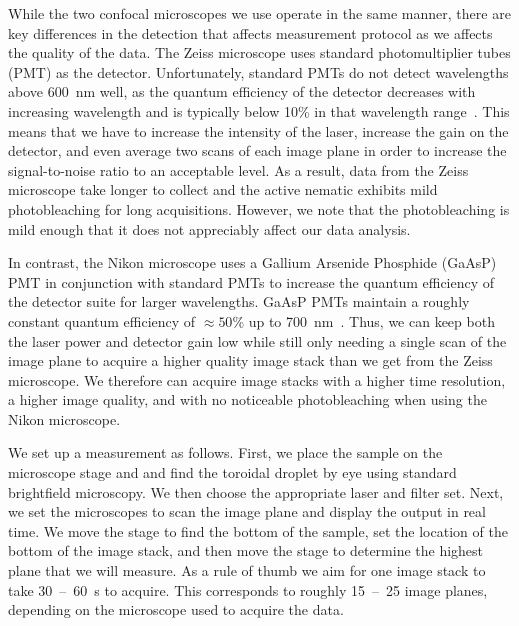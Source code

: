 While the two confocal microscopes we use operate in the same manner, there are key differences in the detection that affects measurement protocol as we affects the quality of the data.
The Zeiss microscope uses standard photomultiplier tubes (PMT) as the detector.
Unfortunately, standard PMTs do not detect wavelengths above 600~nm well, as the quantum efficiency of the detector decreases with increasing wavelength and is typically below 10\% in that wavelength range~\cite{RN263}.
This means that we have to increase the intensity of the laser, increase the gain on the detector, and even average two scans of each image plane in order to increase the signal-to-noise ratio to an acceptable level.
As a result, data from the Zeiss microscope take longer to collect and the active nematic exhibits mild photobleaching for long acquisitions.
However, we note that the photobleaching is mild enough that it does not appreciably affect our data analysis.

In contrast, the Nikon microscope uses a Gallium Arsenide Phosphide (GaAsP) PMT in conjunction with standard PMTs to increase the quantum efficiency of the detector suite for larger wavelengths.
GaAsP PMTs maintain a roughly constant quantum efficiency of $\approx 50$\% up to 700~nm~\cite{RN263}.
Thus, we can keep both the laser power and detector gain low while still only needing a single scan of the image plane to acquire a higher quality image stack than we get from the Zeiss microscope.
We therefore can acquire image stacks with a higher time resolution, a higher image quality, and with no noticeable photobleaching when using the Nikon microscope.

We set up a measurement as follows.
First, we place the sample on the microscope stage and and find the toroidal droplet by eye using standard brightfield microscopy.
We then choose the appropriate laser and filter set.
Next, we set the microscopes to scan the image plane and display the output in real time.
We move the stage to find the bottom of the sample, set the location of the bottom of the image stack, and then move the stage to determine the highest plane that we will measure.
As a rule of thumb we aim for one image stack to take 30~--~60~s to acquire.
This corresponds to roughly 15~--~25 image planes, depending on the microscope used to acquire the data.

